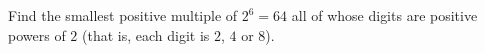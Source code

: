 Find the smallest positive multiple of $2^6=64$ all of whose digits are positive powers of $2$ (that is, each digit is $2$, $4$ or $8$).
